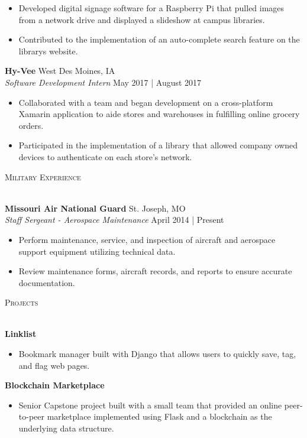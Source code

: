 \documentclass[a4paper]{article}
\newcommand{\lineunder} {
    \vspace*{-8pt} \\
    \hspace*{-18pt} \hrulefill \\
}
\newcommand{\header} [1] {
    {\hspace*{-18pt}\vspace*{6pt} \textsc{#1}}
    \vspace*{-6pt} \lineunder
}
\begin{document}
\vspace{-1mm}
\begin{itemize} \itemsep 1pt
	\item Developed digital signage software for a Raspberry Pi that pulled images from a network drive and displayed a slideshow at campus libraries.
	\item Contributed to the implementation of an auto-complete search feature on the library\textquotesingle{}s website.
\end{itemize}
\textbf{Hy-Vee} \hfill West Des Moines, IA\\
\textit{Software Development Intern} \hfill May 2017 | August 2017\\
\vspace{-1mm}
\begin{itemize} \itemsep 1pt
	\item Collaborated with a team and began development on a cross-platform Xamarin application to aide stores and warehouses in fulfilling online grocery orders.
	\item Participated in the implementation of a library that allowed company owned devices to authenticate on each store's network.
\end{itemize}

\header{Military Experience}
\vspace{1mm}

\textbf{Missouri Air National Guard} \hfill St. Joseph, MO\\
\textit{Staff Sergeant - Aerospace Maintenance} \hfill April 2014 | Present\\
\vspace{-1mm}
\begin{itemize} \itemsep 1pt
	\item Perform maintenance, service, and inspection of aircraft and aerospace support equipment utilizing technical data.
	\item Review maintenance forms, aircraft records, and reports to ensure accurate documentation.
\end{itemize}

\header{Projects}
\vspace{1mm}

\textbf{Linklist}
\vspace{-1mm}
\begin{itemize} \itemsep 1pt
	\item Bookmark manager built with Django that allows users to quickly save, tag, and flag web pages.
\end{itemize}
\textbf{Blockchain Marketplace}
\vspace{-1mm}
\begin{itemize} \itemsep 1pt
       \item Senior Capstone project built with a small team that provided an online peer-to-peer marketplace implemented using Flask and a blockchain as the underlying data structure.
\end{itemize}
\end{document}
